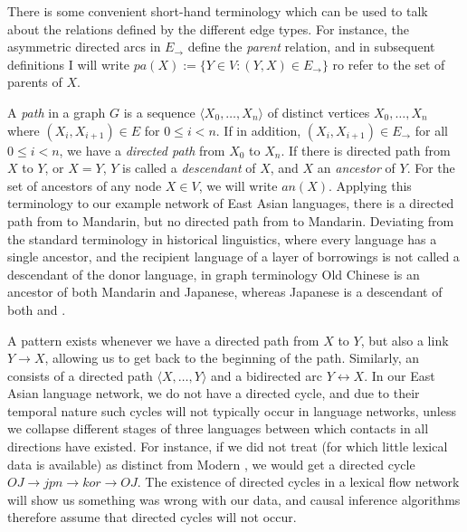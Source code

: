 There is some convenient short-hand terminology which can be used to talk about the relations defined by the different edge types. For instance, the asymmetric directed arcs in $E_\rightarrow$ define the \textit{parent} relation, and in subsequent definitions I will write $pa(X) := \{Y \in V\colon (Y,X) \in E_{\rightarrow}\}$ ro refer to the set of parents of $X$.

A \textit{path} in a graph $G$ is a sequence $\langle X_0,\dots,X_n \rangle$ of distinct vertices $X_0,\dots,X_n$ where $(X_i,X_{i+1}) \in E$ for $0 \leq i < n$. If in addition, $(X_i,X_{i+1}) \in E_\rightarrow$ for all $0 \leq i < n$, we have a \textit{directed path} from $X_0$ to $X_n$. If there is directed path from $X$ to $Y$, or $X = Y$, $Y$ is called a \textit{descendant} of $X$, and $X$ an \textit{ancestor} of $Y$. For the set of ancestors of any node $X \in V$, we will write $an(X)$. Applying this terminology to our example network of East Asian languages, there is a directed path from  to Mandarin, but no directed path from  to Mandarin. Deviating from the standard terminology in historical linguistics, where every language has a single ancestor, and the recipient language of a layer of borrowings is not called a descendant of the donor language, in 
graph terminology Old Chinese is an ancestor of both Mandarin and Japanese, whereas Japanese is a descendant of both  and .

\newpage 
A \textit{} pattern exists whenever we have a directed path from $X$ to $Y$, but also a link $Y \rightarrow X$, allowing us to get back to the beginning of the path. Similarly, an \textit{} consists of a directed path $\langle X,\dots,Y \rangle$ and a bidirected arc $Y \leftrightarrow X$. In our East Asian language network, we do not have a directed cycle, and due to their temporal nature such cycles will not typically occur in language networks, unless we collapse different stages of three languages between which contacts in all directions have existed. For instance, if we did not treat  (for which little lexical data is available) as distinct from Modern , we would get a directed cycle $OJ \rightarrow jpn \rightarrow kor \rightarrow OJ$. The existence of directed cycles in a lexical flow network will show us something was wrong with our data, and causal inference algorithms therefore assume that directed cycles will not occur.

